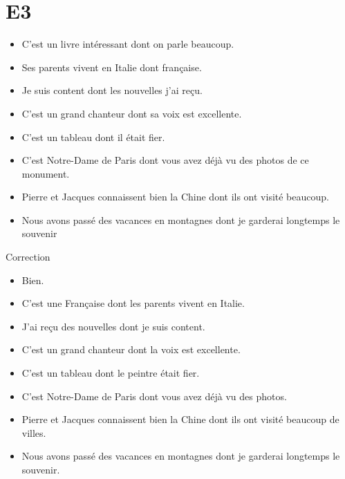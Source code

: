 \documentclass{book}
\begin{document}
    \section{E3}
        \begin{itemize}
            \item C'est un livre intéressant dont on parle beaucoup.
            \item Ses parents vivent en Italie dont française.
            \item Je suis content dont les nouvelles j'ai reçu.
            \item C'est un grand chanteur dont sa voix est excellente.
            \item C'est un tableau dont il était fier.
            \item C'est Notre-Dame de Paris dont vous avez déjà vu des photos de ce monument.
            \item Pierre et Jacques connaissent bien la Chine dont ils ont visité beaucoup.
            \item Nous avons passé des vacances en montagnes dont je garderai longtemps le souvenir
        \end{itemize}
        Correction
        \begin{itemize}
            \item Bien.
            \item C'est une Française dont les parents vivent en Italie.
            \item J'ai reçu des nouvelles dont je suis content.
            \item C'est un grand chanteur dont la voix est excellente.
            \item C'est un tableau dont le peintre était fier.
            \item C'est Notre-Dame de Paris dont vous avez déjà vu des photos.
            \item Pierre et Jacques connaissent bien la Chine dont ils ont visité beaucoup de villes.
            \item Nous avons passé des vacances en montagnes dont je garderai longtemps le souvenir.
        \end{itemize}
    
\end{document}
